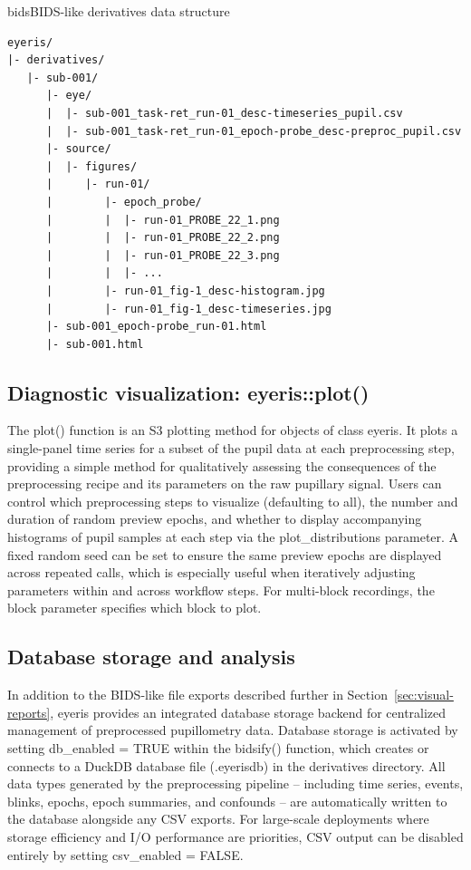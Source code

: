 \begin{eyerisbox}{bids}{BIDS-like derivatives data structure}
\begin{verbatim}
eyeris/
|- derivatives/
   |- sub-001/
      |- eye/
      |  |- sub-001_task-ret_run-01_desc-timeseries_pupil.csv
      |  |- sub-001_task-ret_run-01_epoch-probe_desc-preproc_pupil.csv
      |- source/
      |  |- figures/
      |     |- run-01/
      |        |- epoch_probe/
      |        |  |- run-01_PROBE_22_1.png
      |        |  |- run-01_PROBE_22_2.png
      |        |  |- run-01_PROBE_22_3.png
      |        |  |- ...
      |        |- run-01_fig-1_desc-histogram.jpg
      |        |- run-01_fig-1_desc-timeseries.jpg
      |- sub-001_epoch-probe_run-01.html
      |- sub-001.html
\end{verbatim}
\end{eyerisbox}

\subsection{Diagnostic visualization: eyeris::plot()}
The plot() function is an S3 plotting method for objects of class eyeris. It plots a single-panel time series for a subset of the pupil data at each preprocessing step, providing a simple method for qualitatively assessing the consequences of the preprocessing recipe and its parameters on the raw pupillary signal. Users can control which preprocessing steps to visualize (defaulting to all), the number and duration of random preview epochs, and whether to display accompanying histograms of pupil samples at each step via the plot\_distributions parameter. A fixed random seed can be set to ensure the same preview epochs are displayed across repeated calls, which is especially useful when iteratively adjusting parameters within and across workflow steps. For multi-block recordings, the block parameter specifies which block to plot.

\subsection{Database storage and analysis}
In addition to the BIDS-like file exports described further in Section~\ref{sec:visual-reports}, eyeris provides an integrated database storage backend for centralized management of preprocessed pupillometry data. Database storage is activated by setting db\_enabled = TRUE within the bidsify() function, which creates or connects to a DuckDB \parencite{raasveldt2019duckdb} database file (.eyerisdb) in the derivatives directory. All data types generated by the preprocessing pipeline – including time series, events, blinks, epochs, epoch summaries, and confounds – are automatically written to the database alongside any CSV exports. For large-scale deployments where storage efficiency and I/O performance are priorities, CSV output can be disabled entirely by setting csv\_enabled = FALSE.

